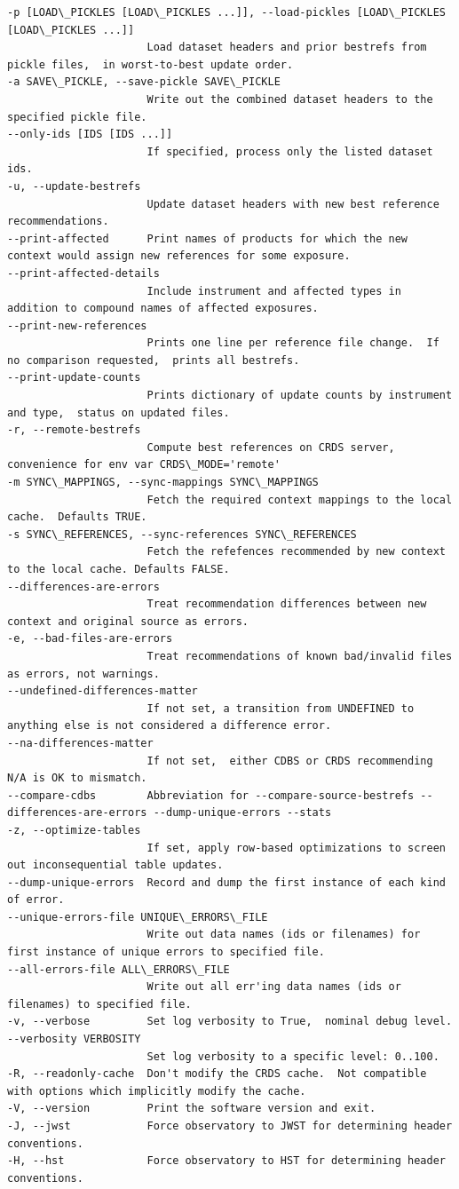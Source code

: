 \documentclass[letterpaper,10pt,english]{sphinxmanual}
\begin{document}
\begin{itemize}
\begin{Verbatim}[commandchars=\\\{\}]
-p [LOAD\_PICKLES [LOAD\_PICKLES ...]], --load-pickles [LOAD\_PICKLES [LOAD\_PICKLES ...]]
                      Load dataset headers and prior bestrefs from pickle files,  in worst-to-best update order.
-a SAVE\_PICKLE, --save-pickle SAVE\_PICKLE
                      Write out the combined dataset headers to the specified pickle file.
--only-ids [IDS [IDS ...]]
                      If specified, process only the listed dataset ids.
-u, --update-bestrefs
                      Update dataset headers with new best reference recommendations.
--print-affected      Print names of products for which the new context would assign new references for some exposure.
--print-affected-details
                      Include instrument and affected types in addition to compound names of affected exposures.
--print-new-references
                      Prints one line per reference file change.  If no comparison requested,  prints all bestrefs.
--print-update-counts
                      Prints dictionary of update counts by instrument and type,  status on updated files.
-r, --remote-bestrefs
                      Compute best references on CRDS server,  convenience for env var CRDS\_MODE='remote'
-m SYNC\_MAPPINGS, --sync-mappings SYNC\_MAPPINGS
                      Fetch the required context mappings to the local cache.  Defaults TRUE.
-s SYNC\_REFERENCES, --sync-references SYNC\_REFERENCES
                      Fetch the refefences recommended by new context to the local cache. Defaults FALSE.
--differences-are-errors
                      Treat recommendation differences between new context and original source as errors.
-e, --bad-files-are-errors
                      Treat recommendations of known bad/invalid files as errors, not warnings.
--undefined-differences-matter
                      If not set, a transition from UNDEFINED to anything else is not considered a difference error.
--na-differences-matter
                      If not set,  either CDBS or CRDS recommending N/A is OK to mismatch.
--compare-cdbs        Abbreviation for --compare-source-bestrefs --differences-are-errors --dump-unique-errors --stats
-z, --optimize-tables
                      If set, apply row-based optimizations to screen out inconsequential table updates.
--dump-unique-errors  Record and dump the first instance of each kind of error.
--unique-errors-file UNIQUE\_ERRORS\_FILE
                      Write out data names (ids or filenames) for first instance of unique errors to specified file.
--all-errors-file ALL\_ERRORS\_FILE
                      Write out all err'ing data names (ids or filenames) to specified file.
-v, --verbose         Set log verbosity to True,  nominal debug level.
--verbosity VERBOSITY
                      Set log verbosity to a specific level: 0..100.
-R, --readonly-cache  Don't modify the CRDS cache.  Not compatible with options which implicitly modify the cache.
-V, --version         Print the software version and exit.
-J, --jwst            Force observatory to JWST for determining header conventions.
-H, --hst             Force observatory to HST for determining header conventions.
\end{Verbatim}

\end{itemize}
\end{document}
